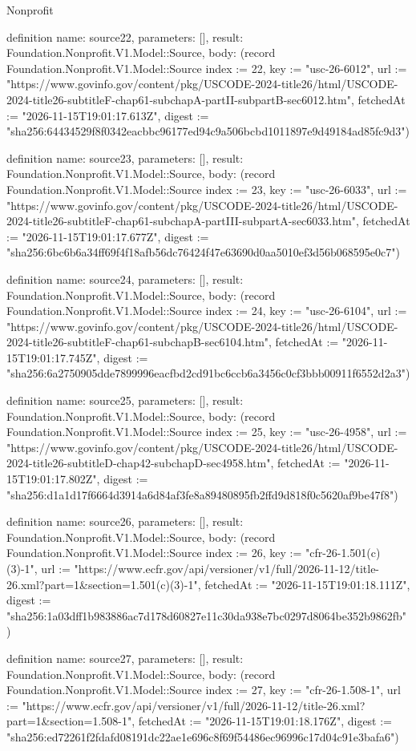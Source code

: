 \begin{lexlean}{Nonprofit}
\begin{semanticmodule}
definition{
  name: source22,
  parameters: [],
  result: Foundation.Nonprofit.V1.Model::Source,
  body: (record Foundation.Nonprofit.V1.Model::Source {index := 22, key := "usc-26-6012", url := "https://www.govinfo.gov/content/pkg/USCODE-2024-title26/html/USCODE-2024-title26-subtitleF-chap61-subchapA-partII-subpartB-sec6012.htm", fetchedAt := "2026-11-15T19:01:17.613Z", digest := "sha256:64434529f8f0342eacbbc96177ed94c9a506bcbd1011897e9d49184ad85fc9d3"})
}

definition{
  name: source23,
  parameters: [],
  result: Foundation.Nonprofit.V1.Model::Source,
  body: (record Foundation.Nonprofit.V1.Model::Source {index := 23, key := "usc-26-6033", url := "https://www.govinfo.gov/content/pkg/USCODE-2024-title26/html/USCODE-2024-title26-subtitleF-chap61-subchapA-partIII-subpartA-sec6033.htm", fetchedAt := "2026-11-15T19:01:17.677Z", digest := "sha256:6bc6b6a34ff69f4f18afb56dc76424f47e63690d0aa5010ef3d56b068595e0c7"})
}

definition{
  name: source24,
  parameters: [],
  result: Foundation.Nonprofit.V1.Model::Source,
  body: (record Foundation.Nonprofit.V1.Model::Source {index := 24, key := "usc-26-6104", url := "https://www.govinfo.gov/content/pkg/USCODE-2024-title26/html/USCODE-2024-title26-subtitleF-chap61-subchapB-sec6104.htm", fetchedAt := "2026-11-15T19:01:17.745Z", digest := "sha256:6a2750905dde7899996eacfbd2cd91bc6ccb6a3456c0cf3bbb00911f6552d2a3"})
}

definition{
  name: source25,
  parameters: [],
  result: Foundation.Nonprofit.V1.Model::Source,
  body: (record Foundation.Nonprofit.V1.Model::Source {index := 25, key := "usc-26-4958", url := "https://www.govinfo.gov/content/pkg/USCODE-2024-title26/html/USCODE-2024-title26-subtitleD-chap42-subchapD-sec4958.htm", fetchedAt := "2026-11-15T19:01:17.802Z", digest := "sha256:d1a1d17f6664d3914a6d84af3fe8a89480895fb2ffd9d818f0c5620af9be47f8"})
}

definition{
  name: source26,
  parameters: [],
  result: Foundation.Nonprofit.V1.Model::Source,
  body: (record Foundation.Nonprofit.V1.Model::Source {index := 26, key := "cfr-26-1.501(c)(3)-1", url := "https://www.ecfr.gov/api/versioner/v1/full/2026-11-12/title-26.xml?part=1&section=1.501(c)(3)-1", fetchedAt := "2026-11-15T19:01:18.111Z", digest := "sha256:1a03dff1b983886ac7d178d60827e11c30da938e7bc0297d8064be352b9862fb"})
}

definition{
  name: source27,
  parameters: [],
  result: Foundation.Nonprofit.V1.Model::Source,
  body: (record Foundation.Nonprofit.V1.Model::Source {index := 27, key := "cfr-26-1.508-1", url := "https://www.ecfr.gov/api/versioner/v1/full/2026-11-12/title-26.xml?part=1&section=1.508-1", fetchedAt := "2026-11-15T19:01:18.176Z", digest := "sha256:ed72261f2fdafd08191dc22ae1e696c8f69f54486ec96996c17d04c91e3bafa6"})
}


\end{semanticmodule}
\end{lexlean}
